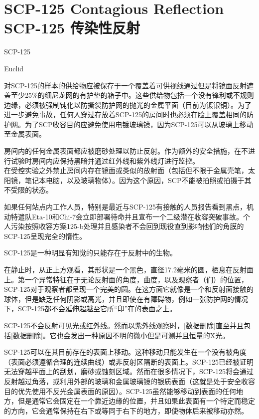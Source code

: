 \chapter[SCP-125 传染性反射]{
    SCP-125 Contagious Reflection\\
    SCP-125 传染性反射
}

\label{chap:SCP-125}

SCP-125

Euclid

对SCP-125的样本的供给物应被保存于一个覆盖着可供视线通过但是将镜面反射遮盖至少25\%的细尼龙网的有护垫的箱子中。这些供给物包括一个没有锋利或不规则边缘，必须被强制钝化以防撕裂防护网的抛光的金属平面（目前为镀银铜）。为了进一步避免事故，任何人穿过存放着SCP-125的房间时也必须在脸上覆盖相同的防护网。为了SCP收容目的应避免使用电镀玻璃镜，因为SCP-125可以从玻璃上移动至金属表面。

房间内的任何金属表面都应被磨砂处理以防止反射。作为额外的安全措施，在不进行试验时房间内应保持黑暗并通过红外线和紫外线灯进行监控。\\
在受控实验之外禁止房间内存在镜面或类似的放射面（包括但不限于金属壳笔，太阳镜，笔记本电脑，以及玻璃物体）。因为这个原因，SCP不能被拍照或拍摄于其不受限的状态。

如果任何站点内工作人员，特别是最近与SCP-125有接触的人员报告看到黑点，机动特遣队Eta-10和Chi-7会立即部署待命并且宣布一个二级潜在收容突破事故。个人污染按照收容方案125-b处理并且感染者不会回到现役直到影响他们的角膜的SCP-125呈现完全的惰性。

SCP-125是一种明显有知觉的只能存在于反射中的生物。

在静止时，从正上方观看，其形状是一个黑色，直径17.2毫米的圆，栖息在反射面上。第一个异常特征在于无论反射面的角度，曲度，以及观察者（们）的位置，SCP-125对于观察者都呈现一个完美的圆。在这方面它就像是一个和反射面接触的球体，但是缺乏任何阴影或高光，并且即使在有障碍物，例如一张防护网的情况下，SCP-125都不会延伸超越至它所“印”在的表面之上。

SCP-125不会反射可见光或红外线。然而以紫外线观察时，{[}数据删除]直至并且包括{[}数据删除]。它也会发出一种原因不明的微小但是可测并且恒量的X光。

SCP-125可以在其目前存在的表面上移动。这种移动只能发生在一个没有被角度（表面必须遵循合理的连续曲线）或非反射区隔断的表面上。SCP-125已经被证明无法穿越平面上的刮划，磨砂或蚀刻区域。然而在很多情况下，SCP-125将会通过反射越过角落，或利用外部的玻璃和金属玻璃镜的银质表面（这就是处于安全收容目的优先使用不反光金属表面的原因）。SCP-125虽然能够移动到表面的任何地方，但是通常它会固定在一个靠近边缘的位置，并且如果此表面有一个特定而稳定的方向，它会通常保持在右下或等同于右下的地方，即使物体后来被移动亦然。

